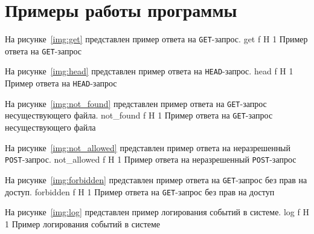 \section{Примеры работы программы}

На рисунке~\ref{img:get} представлен пример ответа на \texttt{GET}-запрос.
	{get}
	{f}
	{H}
	{1\textwidth}
	{Пример ответа на \texttt{GET}-запрос}

\clearpage
На рисунке~\ref{img:head} представлен пример ответа на \texttt{HEAD}-запрос.
	{head}
	{f}
	{H}
	{1\textwidth}
	{Пример ответа на \texttt{HEAD}-запрос}

На рисунке~\ref{img:not_found} представлен пример ответа на \texttt{GET}-запрос несуществующего файла.
	{not_found}
	{f}
	{H}
	{1\textwidth}
	{Пример ответа на \texttt{GET}-запрос несуществующего файла}

На рисунке~\ref{img:not_allowed} представлен пример ответа на неразрешенный \texttt{POST}-запрос.
	{not_allowed}
	{f}
	{H}
	{1\textwidth}
	{Пример ответа на неразрешенный \texttt{POST}-запрос}

\clearpage
На рисунке~\ref{img:forbidden} представлен пример ответа на \texttt{GET}-запрос без прав на доступ.
	{forbidden}
	{f}
	{H}
	{1\textwidth}
	{Пример ответа на \texttt{GET}-запрос без прав на доступ}

На рисунке~\ref{img:log} представлен пример логирования событий в системе.
	{log}
	{f}
	{H}
	{1\textwidth}
	{Пример логирования событий в системе}